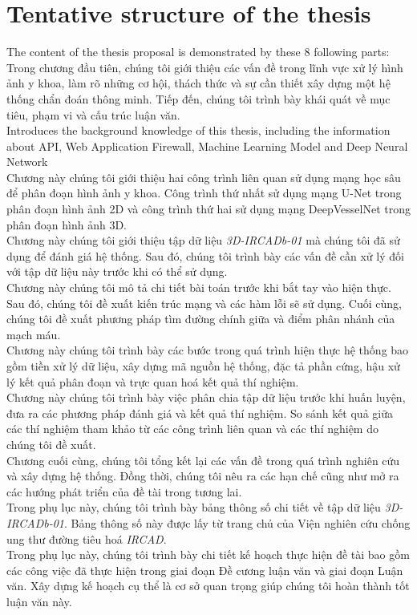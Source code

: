 \section{Tentative structure of the thesis}
\label{sec:structure}
	\newcommand\nextintro{\\[7mm]}
	The content of the thesis proposal is demonstrated by these 8 following parts: \nextintro
	 Trong chương đầu tiên, chúng tôi giới thiệu các vấn đề trong lĩnh vực xử lý hình ảnh y khoa, làm rõ những cơ hội, thách thức và sự cần thiết xây dựng một hệ thống chẩn đoán thông minh. Tiếp đến, chúng tôi trình bày khái quát về mục tiêu, phạm vi và cấu trúc luận văn.\nextintro
	 Introduces the background knowledge of this thesis, including the information about API, Web Application Firewall, Machine Learning Model and Deep Neural Network\nextintro
	 Chương này chúng tôi giới thiệu hai công trình liên quan sử dụng mạng học sâu để phân đoạn hình ảnh y khoa. Công trình thứ nhất sử dụng mạng U-Net trong phân đoạn hình ảnh 2D và công trình thứ hai sử dụng mạng DeepVesselNet trong phân đoạn hình ảnh 3D.\nextintro
	 Chương này chúng tôi giới thiệu tập dữ liệu \textit{3D-IRCADb-01} mà chúng tôi đã sử dụng để đánh giá hệ thống. Sau đó, chúng tôi trình bày các vấn đề cần xử lý đối với tập dữ liệu này trước khi có thể sử dụng.\nextintro
	 Chương này chúng tôi mô tả chi tiết bài toán trước khi bắt tay vào hiện thực. Sau đó, chúng tôi đề xuất kiến trúc mạng và các hàm lỗi sẽ sử dụng. Cuối cùng, chúng tôi đề xuất phương pháp tìm đường chính giữa và điểm phân nhánh của mạch máu.\nextintro
	 Chương này chúng tôi trình bày các bước trong quá trình hiện thực hệ thống bao gồm tiền xử lý dữ liệu, xây dựng mã nguồn hệ thống, đặc tả phần cứng, hậu xử lý kết quả phân đoạn và trực quan hoá kết quả thí nghiệm.\nextintro
	 Chương này chúng tôi trình bày việc phân chia tập dữ liệu trước khi huấn luyện, đưa ra các phương pháp đánh giá và kết quả thí nghiệm. So sánh kết quả giữa các thí nghiệm tham khảo từ các công trình liên quan và các thí nghiệm do chúng tôi đề xuất.\nextintro
	 Chương cuối cùng, chúng tôi tổng kết lại các vấn đề trong quá trình nghiên cứu và xây dựng hệ thống. Đồng thời, chúng tôi nêu ra các hạn chế cũng như mở ra các hướng phát triển của đề tài trong tương lai.\nextintro
	 Trong phụ lục này, chúng tôi trình bày bảng thông số chi tiết về tập dữ liệu \textit{3D-IRCADb-01}. Bảng thông số này được lấy từ trang chủ của Viện nghiên cứu chống ung thư đường tiêu hoá \textit{IRCAD}. \nextintro
	 Trong phụ lục này, chúng tôi trình bày chi tiết kế hoạch thực hiện đề tài bao gồm các công việc đã thực hiện trong giai đoạn Đề cương luận văn và giai đoạn Luận văn. Xây dựng kế hoạch cụ thể là cơ sở quan trọng giúp chúng tôi hoàn thành tốt luận văn này.